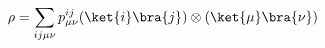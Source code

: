 \begin{equation}\label{eqn:rho_bi}
\rho = \sum_{ij\mu\nu}p^{ij}_{\mu\nu}(\ket{i}\bra{j}) \otimes (\ket{\mu}\bra{\nu})
\end{equation}
